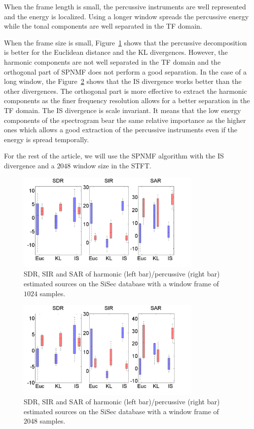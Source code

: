 When the frame length is small, the percussive instruments are well represented and the energy is localized. Using a longer window spreads the percussive energy while the tonal components are well separated in the TF domain.

When the frame size is small, Figure~\ref{frame1024} shows that the percussive decomposition is better for the Euclidean distance and the KL divergences. However, the harmonic components are not well separated in the TF domain and the orthogonal part of SPNMF does not perform a good separation.  
In the case of a long window, the Figure~\ref{frame2048} shows that the IS divergence works better than the other divergences. The orthogonal part is more effective to extract the harmonic components as the finer frequency resolution allows for a better separation in the TF domain. The IS divergence is scale invariant. It means that the low energy components of the spectrogram bear the same relative importance as the higher ones which allows a good extraction of the percussive instruments even if the energy is spread temporally.


For the rest of the article, we will use the SPNMF algorithm with the IS divergence and a $2048$ window size in the STFT.


\begin{figure}[htb]

  \centering 
  \includegraphics[width=9cm]{fig/DivergenceFrame1024}
  \caption{\label{frame1024} SDR, SIR and SAR of harmonic (left bar)/percussive (right bar) estimated sources on the SiSec database with a window frame of $1024$ samples.}
  
\end{figure}


\begin{figure}[htb]

  \centering 
  \includegraphics[width=9cm]{fig/DivergenceFrame2048}
  \caption{\label{frame2048} SDR, SIR and SAR of harmonic (left bar)/percussive (right bar) estimated sources on the SiSec database with a window frame of $2048$ samples.}
  
\end{figure}



